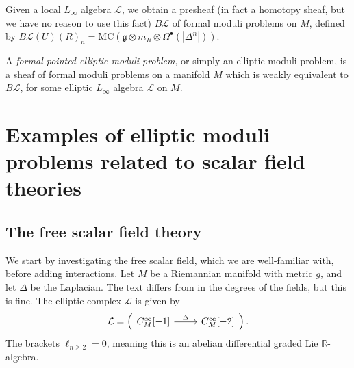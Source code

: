 Given a local $L_\infty $ algebra $\mathcal{L} $, we obtain a presheaf (in fact a homotopy sheaf, but we have no reason to use this fact) $B\mathcal{L} $ of formal moduli problems on $M$, defined by $B\mathcal{L} (U)(R)_n = \mathrm{MC} (\mathfrak{g} \otimes m_R \otimes \Omega ^{\bullet} (\left| \Delta ^{n}  \right| ))$.

\begin{definition}\label{dfn:11-1-5}
	A \emph{formal pointed elliptic moduli problem}, or simply an elliptic moduli problem, is a sheaf of formal moduli problems on a manifold $M$ which is weakly equivalent to $B\mathcal{L} $, for some elliptic $L_\infty $ algebra $\mathcal{L} $ on $M$.
\end{definition}


\section{Examples of elliptic moduli problems related to scalar field theories}

\subsection{The free scalar field theory}

We start by investigating the free scalar field, which we are well-familiar with, before adding interactions. Let $M$ be a Riemannian manifold with metric $g$, and let $\Delta $ be the Laplacian. The text \cite{cg2} differs from \cite{cg1} in the degrees of the fields, but this is fine. The elliptic complex $\mathcal{L} $ is given by
\[
	\mathcal{L} =\left( 
	\begin{tikzcd}
		{C^\infty_M[-1]}\ar[" \Delta  ", r] & {C^\infty _M[-2]}
	\end{tikzcd}
	\right) 
.\]
The brackets $\ell _{n\geq 2} =0$, meaning this is an abelian differential graded Lie $\mathbb{R} $-algebra.

